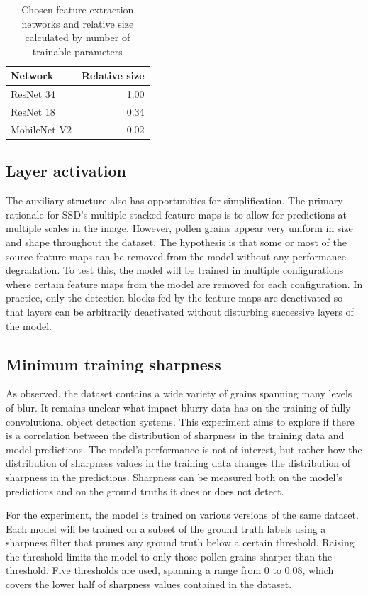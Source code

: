 \begin{table}[htbp]\centering
\caption[Feature extraction networks]{Chosen feature extraction networks and relative size calculated by number of trainable parameters}%
\label{tab:ex01}
\begin{tabular}{@{}lr@{}}\toprule
  Network & Relative size \\
  \midrule
     ResNet 34 & 1.00  \\
     ResNet 18 & 0.34  \\
  MobileNet V2 & 0.02  \\
  \bottomrule
\end{tabular}
\end{table}

\subsection{Layer activation}
The auxiliary structure also has opportunities for simplification.
The primary rationale for SSD's multiple stacked feature maps is to allow for predictions at multiple scales in the image.
However, pollen grains appear very uniform in size and shape throughout the dataset.
The hypothesis is that some or most of the source feature maps can be removed from the model without any performance degradation.
To test this, the model will be trained in multiple configurations where certain feature maps from the model are removed for each configuration.
In practice, only the detection blocks fed by the feature maps are deactivated so that layers can be arbitrarily deactivated without disturbing successive layers of the model.

\subsection{Minimum training sharpness}
As observed, the dataset contains a wide variety of grains spanning many levels of blur.
It remains unclear what impact blurry data has on the training of fully convolutional object detection systems.
This experiment aims to explore if there is a correlation between the distribution of sharpness in the training data and model predictions.
The model's performance is not of interest, but rather how the distribution of sharpness values in the training data changes the distribution of sharpness in the predictions.
Sharpness can be measured both on the model's predictions and on the ground truths it does or does not detect.

For the experiment, the model is trained on various versions of the same dataset.
Each model will be trained on a subset of the ground truth labels using a sharpness filter that prunes any ground truth below a certain threshold.
Raising the threshold limits the model to only those pollen grains sharper than the threshold.
Five thresholds are used, spanning a range from 0 to 0.08, which covers the lower half of sharpness values contained in the dataset.

